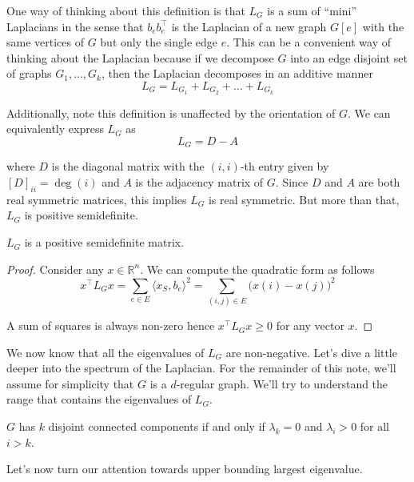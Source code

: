 One way of thinking about this definition is that $L_G$ is a sum of ``mini'' Laplacians in the sense that $b_e b_e^\top$ is the Laplacian of a new graph $G[e]$ with the same vertices of $G$ but only the single edge $e$. This can be a convenient way of thinking about the Laplacian because if we decompose $G$ into an edge disjoint set of graphs $G_1, \ldots, G_k$, then the Laplacian decomposes in an additive manner
\begin{equation*}
L_G = L_{G_1} + L_{G_2} + \ldots + L_{G_k}
\end{equation*}

Additionally, note this definition is unaffected by the orientation of $G$. We can equivalently express $L_G$ as
\begin{equation*}
L_G = D - A
\end{equation*}

where $D$ is the diagonal matrix with the $(i, i)$-th entry given by $[D]_{ii} = \deg(i)$ and $A$ is the adjacency matrix of $G$. Since $D$ and $A$ are both real symmetric matrices, this implies $L_G$ is real symmetric. But more than that, $L_G$ is positive semidefinite.
\begin{claim}
$L_G$ is a positive semidefinite matrix.
\end{claim}
\begin{proof}
Consider any $x \in \mathbb{R}^n$. We can compute the quadratic form as follows
\begin{equation*}
x^\top L_G x
= \sum_{e \in E} \langle x_S, b_e \rangle^2
= \sum_{(i, j) \in E} \big( x(i) - x(j) \big)^2
\end{equation*}

A sum of squares is always non-zero hence $x^\top L_G x \geq 0$ for any vector $x$.
\end{proof}

We now know that all the eigenvalues of $L_G$ are non-negative. Let's dive a little deeper into the spectrum of the Laplacian. For the remainder of this note, we'll assume for simplicity that $G$ is a $d$-regular graph. We'll try to understand the range that contains the eigenvalues of $L_G$.


\begin{corollary}
$G$ has $k$ disjoint connected components if and only if $\lambda_k = 0$ and $\lambda_i > 0$ for all $i > k$.
\end{corollary}

Let's now turn our attention towards upper bounding largest eigenvalue.
